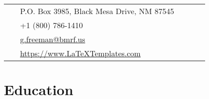 \documentclass[10pt]{article} %
\begin{document}
\begin{paracol}{2}
\switchcolumn %


\parbox[top][0.12\textheight][c]{\linewidth}{ %
	\vspace{-0.04\textheight} %
	\colorbox{shade}{ %
		\begin{supertabular}{p{0.05\linewidth}|p{0.775\linewidth}} %
			\raisebox{-1pt}{\faHome} & P.O. Box 3985, Black Mesa Drive, NM 87545 \\ %
			\raisebox{-1pt}{\faPhone} & +1 (800) 786-1410 \\ %
			\raisebox{0pt}{\small\faEnvelope} & \href{mailto:g.freeman@bmrf.us}{g.freeman@bmrf.us} \\ %
			\raisebox{-1pt}{\small\faDesktop} & \href{https://www.LaTeXTemplates.com}{https://www.LaTeXTemplates.com} \\ %
		\end{supertabular}
	}
}


\section{Education} 




\end{paracol}
\end{document}
